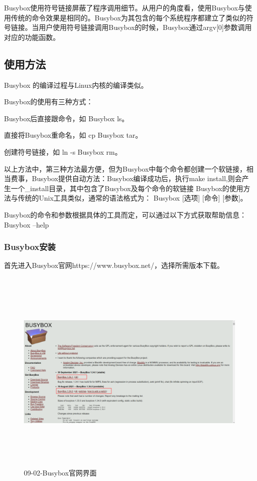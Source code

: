 Busybox使用符号链接屏蔽了程序调用细节。从用户的角度看，使用Busybox与使用传统的命令效果是相同的。Busybox为其包含的每个系统程序都建立了类似的符号链接。当用户使用符号链接调用Busybox的时候，Busybox通过argv[0]参数调用对应的功能函数。

\subsection{使用方法}
Busybox 的编译过程与Linux内核的编译类似。

Busybox的使用有三种方式：

Busybox后直接跟命令，如 Busybox ls。

直接将Busybox重命名，如 cp Busybox tar。

创建符号链接，如 ln -s Busybox rm。

以上方法中，第三种方法最方便，但为Busybox中每个命令都创建一个软链接，相当费事，Busybox提供自动方法：Busybox编译成功后，执行make install,则会产生一个\_install目录，其中包含了Busybox及每个命令的软链接
Busybox的使用方法与传统的Unix工具类似，通常的语法格式为：
Busybox [选项] [命令] [参数]。

Busybox的命令和参数根据具体的工具而定，可以通过以下方式获取帮助信息：
Busybox --help

\subsubsection{Busybox安装}
首先进入Busybox官网https://www.busybox.net/，选择所需版本下载。

\begin{figure}[H]
\centering
\includegraphics[width=17cm,height=10cm]{figures/09-02-Busybox安装1.png}
\caption{09-02-Busybox官网界面}
\end{figure}  

